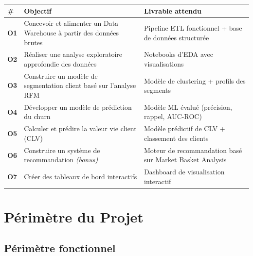 \documentclass[11pt,a4paper]{article}
\begin{document}
\begin{center}
\small
\begin{tabularx}{\textwidth}{>{\bfseries\color{accent}}p{1cm} X X}
\toprule
\rowcolor{primary}
\color{white}\bfseries \# & \color{white}\bfseries Objectif & \color{white}\bfseries Livrable attendu \\
\midrule
O1 & Concevoir et alimenter un Data Warehouse à partir des données brutes & Pipeline ETL fonctionnel + base de données structurée \\
\rowcolor{lightbg}
O2 & Réaliser une analyse exploratoire approfondie des données & Notebooks d'EDA avec visualisations \\
O3 & Construire un modèle de segmentation client basé sur l'analyse RFM & Modèle de clustering + profils des segments \\
\rowcolor{lightbg}
O4 & Développer un modèle de prédiction du churn & Modèle ML évalué (précision, rappel, AUC-ROC) \\
O5 & Calculer et prédire la valeur vie client (CLV) & Modèle prédictif de CLV + classement des clients \\
\rowcolor{lightbg}
O6 & Construire un système de recommandation \textit{(bonus)} & Moteur de recommandation basé sur Market Basket Analysis \\
O7 & Créer des tableaux de bord interactifs & Dashboard de visualisation interactif \\
\bottomrule
\end{tabularx}
\end{center}

\section{Périmètre du Projet}

\subsection{Périmètre fonctionnel}
\end{document}
